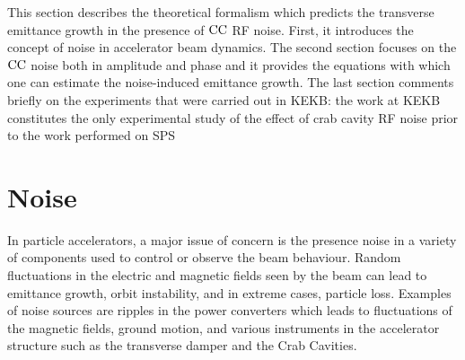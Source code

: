 This section describes the theoretical formalism which predicts the transverse emittance growth in the presence of ${\mathrm{CC}}$ RF noise. First, it introduces the concept of noise in accelerator beam dynamics. The second section focuses on the ${\mathrm{CC}}$ noise both in amplitude and phase and it provides the equations with which one can estimate the noise-induced emittance growth. The last section comments briefly on the experiments that were carried out in KEKB: the work at KEKB constitutes the only experimental study of the effect of crab cavity RF noise prior to the work performed on SPS 



\section{Noise}\label{sec:noise_definition}
In particle accelerators, a major issue of concern is the presence noise in a variety of components used to control or observe the beam behaviour. Random fluctuations in the electric and magnetic fields seen by the beam can lead to emittance growth, orbit instability, and in extreme cases, particle loss. Examples of noise sources are ripples in the power converters which leads to fluctuations of the magnetic fields, ground motion, and various instruments in the accelerator structure such as the transverse damper and the Crab Cavities. %

